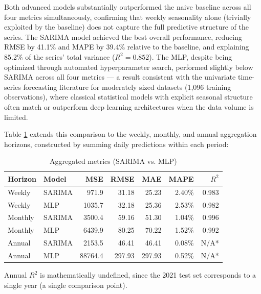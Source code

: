 \documentclass{ieeeaccess}
\begin{document}
Both advanced models substantially outperformed the naive baseline across all four metrics simultaneously, confirming that weekly seasonality alone (trivially exploited by the baseline) does not capture the full predictive structure of the series. The SARIMA model achieved the best overall performance, reducing RMSE by 41.1\% and MAPE by 39.4\% relative to the baseline, and explaining 85.2\% of the series' total variance ($R^2=0.852$). The MLP, despite being optimized through automated hyperparameter search, performed slightly below SARIMA across all four metrics --- a result consistent with the univariate time-series forecasting literature for moderately sized datasets (1,096 training observations), where classical statistical models with explicit seasonal structure often match or outperform deep learning architectures when the data volume is limited.

Table \ref{tab:results_agg} extends this comparison to the weekly, monthly, and annual aggregation horizons, constructed by summing daily predictions within each period:

\begin{table}[t]
\centering
\scriptsize
\setlength{\tabcolsep}{3pt}
\caption{Aggregated metrics (SARIMA vs. MLP)}
\label{tab:results_agg}
\begin{tabular}{llrrrrr}
\toprule
\textbf{Horizon} & \textbf{Model} & \textbf{MSE} & \textbf{RMSE} & \textbf{MAE} & \textbf{MAPE} & \textbf{$R^2$} \\
\midrule
Weekly & SARIMA & 971.9 & 31.18 & 25.23 & 2.40\% & 0.983 \\
Weekly & MLP & 1035.7 & 32.18 & 25.36 & 2.53\% & 0.982 \\
Monthly & SARIMA & 3500.4 & 59.16 & 51.30 & 1.04\% & 0.996 \\
Monthly & MLP & 6439.9 & 80.25 & 70.22 & 1.52\% & 0.992 \\
Annual & SARIMA & 2153.5 & 46.41 & 46.41 & 0.08\% & N/A* \\
Annual & MLP & 88764.4 & 297.93 & 297.93 & 0.52\% & N/A* \\
\bottomrule
\end{tabular}

\vspace{2pt}
{\footnotesize *Annual $R^2$ is mathematically undefined, since the 2021 test set corresponds to a single year (a single comparison point).}
\end{table}
\end{document}
